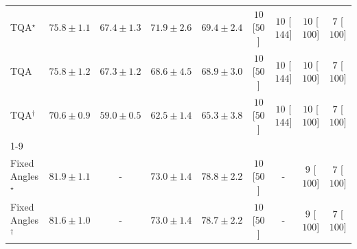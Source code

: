 \begin{tabular}{l|cccc|cccc|}
TQA$^\star$ & {\cellcolor[HTML]{D15205}} \color[HTML]{F1F1F1} $75.8\pm 1.1$ & {\cellcolor[HTML]{FEC754}} \color[HTML]{000000} $67.4\pm 1.3$ & {\cellcolor[HTML]{F5851F}} \color[HTML]{F1F1F1} $71.9\pm 2.6$ & {\cellcolor[HTML]{FEAA38}} \color[HTML]{000000} $69.4\pm 2.4$ & {\cellcolor[HTML]{FFF7F3}} \color[HTML]{000000} $10$ [$50$] & {\cellcolor[HTML]{FFF7F3}} \color[HTML]{000000} $10$ [$144$] & {\cellcolor[HTML]{FFF7F3}} \color[HTML]{000000} $10$ [$100$] & {\cellcolor[HTML]{FFF7F3}} \color[HTML]{000000} $7$ [$100$] \\
TQA & {\cellcolor[HTML]{D15205}} \color[HTML]{F1F1F1} $75.8\pm 1.2$ & {\cellcolor[HTML]{FEC857}} \color[HTML]{000000} $67.3\pm 1.2$ & {\cellcolor[HTML]{FEB643}} \color[HTML]{000000} $68.6\pm 4.5$ & {\cellcolor[HTML]{FEB13E}} \color[HTML]{000000} $68.9\pm 3.0$ & {\cellcolor[HTML]{FFF7F3}} \color[HTML]{000000} $10$ [$50$] & {\cellcolor[HTML]{FFF7F3}} \color[HTML]{000000} $10$ [$144$] & {\cellcolor[HTML]{FFF7F3}} \color[HTML]{000000} $10$ [$100$] & {\cellcolor[HTML]{FFF7F3}} \color[HTML]{000000} $7$ [$100$] \\
TQA$^\dagger$ & {\cellcolor[HTML]{FD9728}} \color[HTML]{000000} $70.6\pm 0.9$ & {\cellcolor[HTML]{FFFFE5}} \color[HTML]{000000} $59.0\pm 0.5$ & {\cellcolor[HTML]{FFF3B4}} \color[HTML]{000000} $62.5\pm 1.4$ & {\cellcolor[HTML]{FEDD84}} \color[HTML]{000000} $65.3\pm 3.8$ & {\cellcolor[HTML]{FFF7F3}} \color[HTML]{000000} $10$ [$50$] & {\cellcolor[HTML]{FFF7F3}} \color[HTML]{000000} $10$ [$144$] & {\cellcolor[HTML]{FFF7F3}} \color[HTML]{000000} $10$ [$100$] & {\cellcolor[HTML]{FFF7F3}} \color[HTML]{000000} $7$ [$100$] \\
\cline{1-9}
\multicolumn{9}{c}{\rule{0pt}{8pt}PP} \\
\midrule
Fixed Angles$^\star$ & {\cellcolor[HTML]{004629}} \color[HTML]{F1F1F1} $81.9\pm 1.1$ & {\cellcolor[HTML]{000000}} \color[HTML]{F1F1F1} {\cellcolor{white}} \color{black} - & {\cellcolor[HTML]{49AF61}} \color[HTML]{F1F1F1} $73.0\pm 1.4$ & {\cellcolor[HTML]{036B38}} \color[HTML]{F1F1F1} $78.8\pm 2.2$ & {\cellcolor[HTML]{FFF7F3}} \color[HTML]{000000} $10$ [$50$] & {\cellcolor[HTML]{000000}} \color[HTML]{F1F1F1} {\cellcolor{white}} \color{black} - & {\cellcolor[HTML]{FFF7F3}} \color[HTML]{000000} $9$ [$100$] & {\cellcolor[HTML]{FFF7F3}} \color[HTML]{000000} $7$ [$100$] \\
Fixed Angles$^\dagger$ & {\cellcolor[HTML]{00492B}} \color[HTML]{F1F1F1} $81.6\pm 1.0$ & {\cellcolor[HTML]{000000}} \color[HTML]{F1F1F1} {\cellcolor{white}} \color{black} - & {\cellcolor[HTML]{49AF61}} \color[HTML]{F1F1F1} $73.0\pm 1.4$ & {\cellcolor[HTML]{056C39}} \color[HTML]{F1F1F1} $78.7\pm 2.2$ & {\cellcolor[HTML]{FFF7F3}} \color[HTML]{000000} $10$ [$50$] & {\cellcolor[HTML]{000000}} \color[HTML]{F1F1F1} {\cellcolor{white}} \color{black} - & {\cellcolor[HTML]{FFF7F3}} \color[HTML]{000000} $9$ [$100$] & {\cellcolor[HTML]{FFF7F3}} \color[HTML]{000000} $7$ [$100$] \\

\end{tabular}
